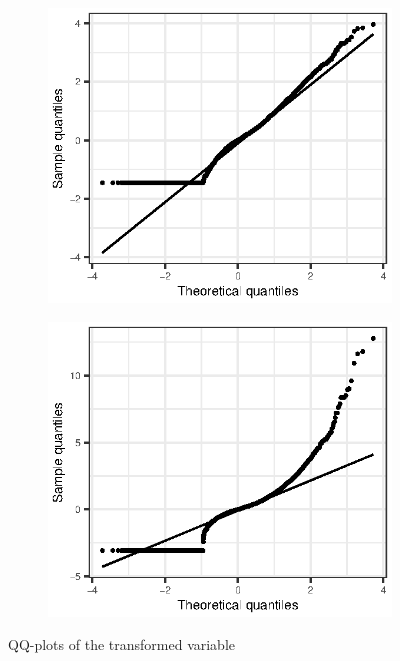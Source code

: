 \documentclass[titlepage]{article}
\begin{document}
\begin{figure}[!htb]
  \begin{subfigure}{0.5\linewidth}
    \includegraphics{q2-qq-tf-yj}
  \end{subfigure}
  \begin{subfigure}{0.5\linewidth}
    \includegraphics{q2-qq-tf-bc}
  \end{subfigure}
  \caption{QQ-plots of the transformed variable}
  \label{fig:q2-qq-tf}
\end{figure}
\end{document}
